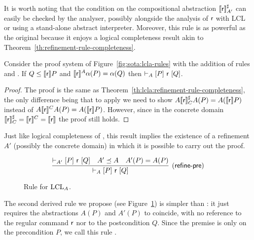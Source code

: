 It is worth noting that the condition on the compositional abstraction $\llbracket\mathsf{r}\rrbracket^{\sharp}_{A'}$ can easily be checked by the analyser, possibly alongside the analysis of $\mathsf{r}$ with LCL or using a stand-alone abstract interpreter.
Moreover, this rule is as powerful as the original  because it enjoys a logical completeness result akin to Theorem~\ref{th:refinement-rule-completeness}.
\begin{theorem}\label{th:lcla:refine-int-completeness}
	Consider the proof system of Figure~\ref{fig:sota:lcla-rules} with the addition of rules  and . If $Q \le \llbracket\mathsf{r}\rrbracket P$ and $\llbracket\mathsf{r}\rrbracket^A \alpha(P) = \alpha(Q)$ then $\vdash_{A}\nobreak[P]~\mathsf{r}~[Q]$.
\end{theorem}
\begin{proof}
	The proof is the same as Theorem~\ref{th:lcla:refinement-rule-completeness}, the only difference being that to apply  we need to show $A \llbracket\mathsf{r}\rrbracket^{\sharp}_{C} A(P) = A(\llbracket\mathsf{r}\rrbracket P)$ instead of $A \llbracket\mathsf{r}\rrbracket^{C} A(P) = A(\llbracket\mathsf{r}\rrbracket P)$. However, since in the concrete domain $\llbracket\mathsf{r}\rrbracket^{\sharp}_{C} = \llbracket\mathsf{r}\rrbracket^{C} = \llbracket\mathsf{r}\rrbracket$ the proof still holds.
\end{proof}

Just like logical completeness of , this result implies the existence of a refinement $A'$ (possibly the concrete domain) in which it is possible to carry out the proof.

\begin{figure*}[t]
	\begin{framed}
		\[
		\infer[\lclrule{refine\mbox{-}pre}]
		{\lcl{A}{P}{\regr}{Q}}
		{\lcl{A'}{P}{\regr}{Q} \quad A' \preceq A \quad A'(P) = A(P) }
		\]
	\end{framed}
	\vspace{-1ex}
	\caption{Rule  for $\text{LCL}_A$.}\label{fig:lcla:rule-refine-pre}
\end{figure*}

The second derived rule we propose (see Figure~\ref{fig:lcla:rule-refine-pre}) is simpler than : it just requires the abstractions $A(P)$ and $A'(P)$ to coincide, with no reference to the regular command $\mathsf{r}$ nor to the postcondition $Q$. Since the premise is only on the precondition $P$, we call this rule .

